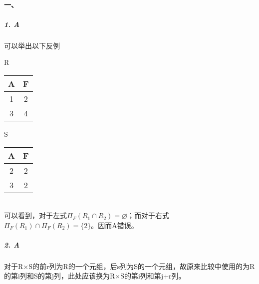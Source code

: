 \documentclass[10pt,a4paper]{article}
\begin{document}
	\pagestyle{main}    %
	
	\setlength{\parskip}{0pt}
	\renewcommand{\baselinestretch}{1.5}
	
    \paragraph{一、}
    \subparagraph{1. A} 可以举出以下反例

    \begin{minipage}{\textwidth} 
        \begin{minipage}[t]{0.35\textwidth} 
        \centering 
        \makeatletter{}\makeatother\caption{R} 
        \begin{tabular}{c|c}
            \hline
            A & F \\ \hline
            1 & 2 \\
            3 & 4 \\
            \hline
        \end{tabular} 
    \end{minipage} 
    \begin{minipage}[t]{0.35\textwidth} 
        \centering 
        \makeatletter{}\makeatother\caption{S} 
        \begin{tabular}{c|c}
            \hline
            A & F \\ \hline
            2 & 2 \\
            3 & 2 \\
            \hline
        \end{tabular} 

    \end{minipage} 

    \end{minipage}
    \vspace{0.5cm}\\
    可以看到，对于左式$\Pi_F(R_1 \cap R_2) = \varnothing$；而对于右式$\Pi_F(R_1) \cap \Pi_F(R_2) = \{2\}$。因而A错误。

    \subparagraph{2. A} 对于R$\times$S的前r列为R的一个元组，后s列为S的一个元组，故原来比较中使用的为R的第i列和S的第j列，此处应该换为R$\times$S的第i列和第j+r列。
\end{document}
